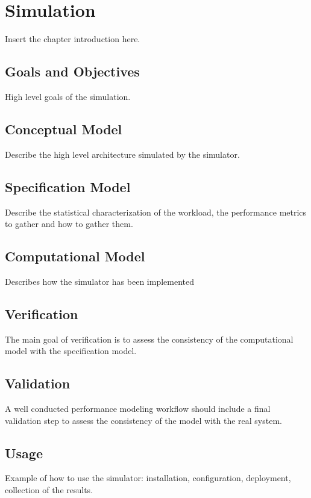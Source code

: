 \chapter{Simulation}
\label{chp:simulation}


Insert the chapter introduction here.


\section{Goals and Objectives}
\label{sec:goals-and-objectives}
High level goals of the simulation.


\section{Conceptual Model}
\label{sec:conceptual-model}
Describe the high level architecture simulated by the simulator.


\section{Specification Model}
\label{sec:specification-model}
Describe the statistical characterization of the workload, the performance metrics to gather and how to gather them.


\section{Computational Model}
\label{sec:computational-model}
Describes how the simulator has been implemented


\section{Verification}
\label{sec:verification}
The main goal of verification is to assess the consistency of the computational model with the specification model. 


\section{Validation}
\label{sec:validation}
A well conducted performance modeling workflow should include a final validation step to assess the consistency of the model with the real system. 


\section{Usage}
\label{sec:usage}
Example of how to use the simulator: installation, configuration, deployment, collection of the results.